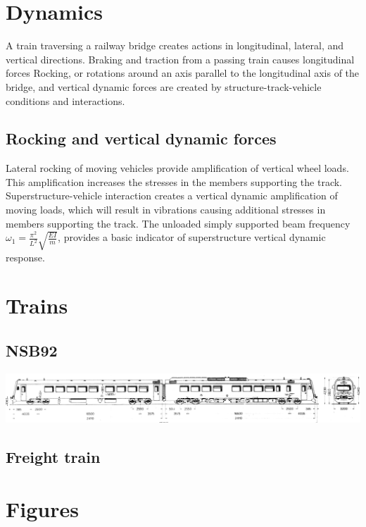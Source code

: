 \section{Dynamics}
A train traversing a railway bridge creates actions in longitudinal, lateral, and vertical directions. Braking and traction from a passing train causes longitudinal forces
Rocking, or rotations around an axis parallel to the longitudinal axis of the bridge, and vertical dynamic forces are created by structure-track-vehicle conditions and interactions.
\subsection{Rocking and vertical dynamic forces}
Lateral rocking of moving vehicles provide amplification of vertical  wheel loads. This amplification increases the stresses in the members supporting the track.
%
Superstructure-vehicle interaction creates a vertical dynamic amplification of moving loads, which will result in vibrations causing additional stresses in members supporting the track.
%
The unloaded simply supported beam frequency $\omega_1 = \frac{\pi^2}{L^2}\sqrt{\frac{EI}{m}}$, provides a basic indicator of superstructure vertical dynamic response.
%
\section{Trains}
\subsection{NSB92}
\label{appendix:nsb92}
\includegraphics[width=0.8\pageheight, height=0.5\pagewidth, angle=270]{./figures/nsb92.png}
\subsection{Freight train}
%
%
\section{Figures}
%
